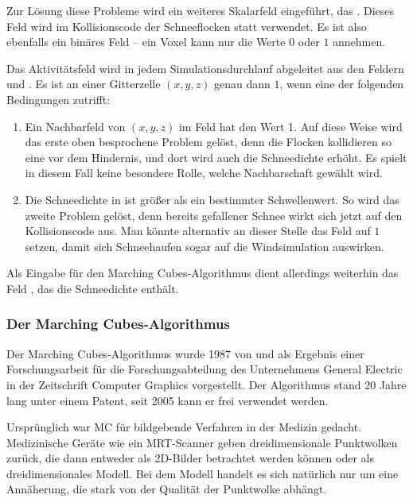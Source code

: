 Zur Lösung diese Probleme wird ein weiteres Skalarfeld eingeführt, das
 . Dieses
Feld wird im Kollisionscode der Schneeflocken statt
 verwendet. Es ist also ebenfalls ein
binäres Feld -- ein Voxel kann nur die Werte $0$ oder $1$ annehmen.

Das Aktivitätsfeld wird in jedem Simulationsdurchlauf abgeleitet aus
den Feldern  und
. Es ist an einer Gitterzelle
$(x,y,z)$ genau dann $1$, wenn eine der folgenden Bedingungen
zutrifft:

\begin{enumerate}
\item Ein Nachbarfeld von $(x,y,z)$ im Feld
 hat den Wert 1. Auf diese Weise wird das
erste oben besprochene Problem gelöst, denn die Flocken kollidieren so
eine  vor dem Hindernis, und dort wird auch die
Schneedichte erhöht. Es spielt in diesem Fall keine besondere Rolle,
welche Nachbarschaft gewählt wird.
\item Die Schneedichte in  ist größer
als ein bestimmter Schwellenwert. So wird das zweite Problem gelöst,
denn bereits gefallener Schnee wirkt sich jetzt auf den Kollisionscode
aus. Man könnte alternativ an dieser Stelle das Feld
 auf $1$ setzen, damit sich Schneehaufen
sogar auf die Windsimulation auswirken.
\end{enumerate}

Als Eingabe für den Marching Cubes-Algorithmus dient allerdings
weiterhin das Feld , das die
Schneedichte enthält.

\subsubsection{Der Marching Cubes-Algorithmus}

Der Marching Cubes-Algorithmus wurde 1987 von
 und 
als Ergebnis einer Forschungsarbeit für die Forschungsabteilung des
Unternehmens General Electric in der Zeitschrift Computer Graphics
vorgestellt\cite{Lorensen:1987:MCH:37402.37422}. Der Algorithmus stand
20 Jahre lang unter einem Patent, seit 2005 kann er frei verwendet
werden.

Ursprünglich war MC für bildgebende Verfahren in der Medizin
gedacht. Medizinische Geräte wie ein MRT-Scanner geben
dreidimensionale Punktwolken zurück, die dann entweder
 als 2D-Bilder betrachtet werden können
oder als dreidimensionales Modell. Bei dem Modell handelt es sich
natürlich nur um eine Annäherung, die stark von der Qualität der
Punktwolke abhängt.

